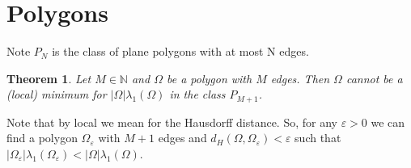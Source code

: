 \documentclass[12pt]{report}
\newtheorem{theorem}{Theorem}[section]
\numberwithin{definition}{section}
\begin{document}
\break

\section{Polygons}

Note $P_{N}$ is the class of plane polygons with at most N edges.



\begin{theorem} \label{egm}
  Let $M \in \mathbb{N}$ and $\Omega$ be a polygon with $M$ edges.
  Then $\Omega$ cannot be a (local) minimum for $|\Omega| \lambda_{1}(\Omega)$ in the class $P_{M+1}$.
\end{theorem}

Note that by local we mean for the Hausdorff distance.
So, for any $\varepsilon > 0$ we can find a polygon $\Omega_{\varepsilon}$ with $M+1$ edges and $d_{H}(\Omega,\Omega_{\varepsilon}) < \varepsilon$ such that $| \Omega_{\varepsilon} |\lambda_{1}(\Omega_{\varepsilon}) <  | \Omega |\lambda_{1}(\Omega)$.
\end{document}
